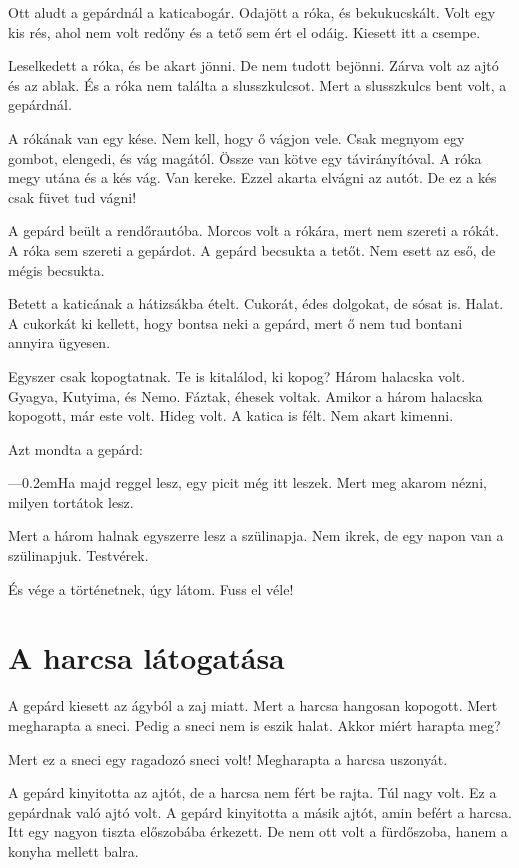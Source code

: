 \documentclass[12pt]{memoir}
\def\dash{---\kern 0.2em}
\begin{document}
Ott aludt a gepárdnál a katicabogár. Odajött a róka, és bekukucskált. Volt egy
kis rés, ahol nem volt redőny és a tető sem ért el odáig. Kiesett itt a csempe.

Leselkedett a róka, és be akart jönni. De nem tudott bejönni. Zárva volt az
ajtó és az ablak. És a róka nem találta a slusszkulcsot. Mert a slusszkulcs
bent volt, a gepárdnál.

A rókának van egy kése. Nem kell, hogy ő vágjon vele. Csak megnyom egy gombot,
elengedi, és vág magától. Össze van kötve egy távirányítóval. A róka megy utána
és a kés vág. Van kereke. Ezzel akarta elvágni az autót. De ez a kés csak füvet
tud vágni!

\bigskip

A gepárd beült a rendőrautóba. Morcos volt a rókára, mert nem szereti a rókát.
A róka sem szereti a gepárdot. A gepárd becsukta a tetőt. Nem esett az eső, de
mégis becsukta.

Betett a katicának a hátizsákba ételt. Cukorát, édes dolgokat, de sósat is.
Halat. A cukorkát ki kellett, hogy bontsa neki a gepárd, mert ő nem tud bontani
annyira ügyesen.

Egyszer csak kopogtatnak. Te is kitalálod, ki kopog? Három halacska volt.
Gyagya, Kutyima, és Nemo. Fáztak, éhesek voltak. Amikor a három halacska
kopogott, már este volt. Hideg volt. A katica is félt. Nem akart kimenni.

Azt mondta a gepárd:

\dash Ha majd reggel lesz, egy picit még itt leszek. Mert meg akarom nézni,
milyen tortátok lesz.

Mert a három halnak egyszerre lesz a szülinapja. Nem ikrek, de egy napon van a
szülinapjuk.  Testvérek.

És vége a történetnek, úgy látom. Fuss el véle!


\section{A harcsa látogatása}
A gepárd kiesett az ágyból a zaj miatt. Mert a harcsa hangosan kopogott. Mert
megharapta a sneci. Pedig a sneci nem is eszik halat. Akkor miért harapta meg?

Mert ez a sneci egy ragadozó sneci volt! Megharapta a harcsa uszonyát.

A gepárd kinyitotta az ajtót, de a harcsa nem fért be rajta. Túl nagy volt. Ez
a gepárdnak való ajtó volt. A gepárd kinyitotta a másik ajtót, amin befért a
harcsa. Itt egy nagyon tiszta előszobába érkezett. De nem ott volt a
fürdőszoba, hanem a konyha mellett balra.
\end{document}
